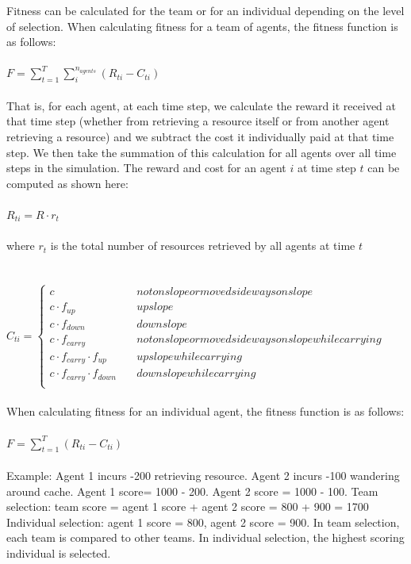 \documentclass[12pt]{article}
\begin{document}
Fitness can be calculated for the team or for an individual depending on the level of selection.
When calculating fitness for a team of agents, the fitness function is as follows:\\ 
\\
$F = \sum_{t=1}^{T} \sum_{i}^{n_{agents}} (R_{ti} - C_{ti}) $\\
\\
That is, for each agent, at each time step, we calculate the reward it received at that time step (whether from retrieving a resource itself or from another agent retrieving a resource) and we subtract the cost it individually paid at that time step. 
We then take the summation of this calculation for all agents over all time steps in the simulation.
The reward and cost for an agent $i$ at time step $t$ can be computed as shown here:\\
\\
$
R_{ti} = R \cdot r_{t}
$\\
\\
where $r_t$ is the total number of resources retrieved by all agents at time $t$
\\
\\
\\
$
C_{ti} = \left\{
        \begin{array}{ll}
            c & \quad not on slope or moved sideways on slope\\
            c \cdot f_{up} & \quad up slope\\
            c \cdot f_{down} & \quad down slope\\
            c \cdot f_{carry} & \quad not on slope or moved sideways on slope while carrying\\
            c \cdot f_{carry} \cdot f_{up} & \quad up slope while carrying \\
            c \cdot f_{carry} \cdot f_{down} & \quad down slope while carrying\\
        \end{array}
    \right.
$
\\
\\
When calculating fitness for an individual agent, the fitness function is as follows:\\
\\
$F = \sum_{t=1}^{T} (R_{ti} - C_{ti}) $
\\
\\
Example: Agent 1 incurs -200 retrieving resource. 
Agent 2 incurs -100 wandering around cache. 
Agent 1 score= 1000 - 200. 
Agent 2 score = 1000 - 100.
Team selection: team score = agent 1 score + agent 2 score = 800 + 900 = 1700
Individual selection: agent 1 score = 800, agent 2 score = 900. 
In team selection, each team is compared to other teams. 
In individual selection, the highest scoring individual is selected. 
\end{document}
